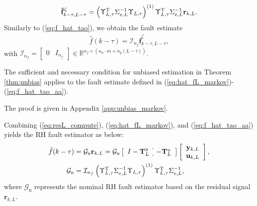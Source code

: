 \documentclass[twocolumn]{autart}
\begin{document}
\begin{equation}\label{eq:hat_fL_markov}
{{\mathbf{\hat {{f}}}}_{k-\tau,L-\tau}^\zeta} =
\left( \Upsilon_{L,\tau}^\mathrm{T} \Sigma_{e,L}^{-1} \Upsilon_{L,\tau} \right)^{(1)} \Upsilon_{L,\tau}^\mathrm{T} \Sigma_{e,L}^{-1} {{\bf{r}}_{k,L}}.
\end{equation}
Similarly to (\ref{eq:f_hat_tao}), we obtain the fault estimate
\begin{equation}\label{eq:f_hat_tao_aa}
\begin{aligned}
\hat f \left( k - \tau \right) = \mathcal{I}_{n_f} {{\mathbf{\hat {{f}}}}_{k-\tau,L-\tau}^\zeta},
\end{aligned}
\end{equation}
with $\mathcal{I}_{n_f} = \left[ \begin{array}{cc}
                                   0 & I_{n_f}
                                 \end{array}
 \right] \in \mathbb{R}^{n_f \times \left( n_u \cdot m + n_y \left( L - \tau \right) \right)}$.


\begin{thm}\label{thm:unbias_markov}
The sufficient and necessary condition for unbiased estimation in Theorem \ref{thm:unbias} applies to the fault estimate defined in (\ref{eq:hat_fL_markov})-(\ref{eq:f_hat_tao_aa}).
\end{thm}

The proof is given in Appendix \ref{app:unbias_markov}.

Combining (\ref{eq:resL_compute}), (\ref{eq:hat_fL_markov}), and (\ref{eq:f_hat_tao_aa}) yields the RH fault estimator as below:
\begin{align}
\hat f(k-\tau) &= \mathcal{G}_\mathrm{n} \mathbf{r}_{k,L} = \mathcal{G}_\mathrm{n} \left[ \begin{array}{c:c}
         I - \mathbf{T}_L^y & -\mathbf{T}_L^u
       \end{array}
 \right] 
 \left[ \begin{array}{c}
          \mathbf{y}_{k,L} \\
          \mathbf{u}_{k,L}
        \end{array}
  \right], \label{eq:RHFEor} \\
\mathcal{G}_\mathrm{n} &=
{\mathcal{I}_{n_f} \left( \Upsilon_{L,\tau}^\mathrm{T} \Sigma_{e,L}^{-1} \Upsilon_{L,\tau} \right)^{(1)} \Upsilon_{L,\tau}^\mathrm{T} \Sigma_{e,L}^{-1} }, \label{eq:RHFEor_F}
\end{align}
where $\mathcal{G}_\mathrm{n}$ represents the nominal RH fault estimator based on the residual signal $\mathbf{r}_{k,L}$.
\end{document}
